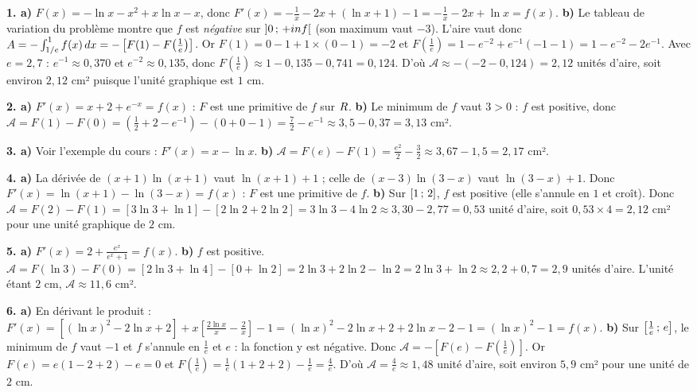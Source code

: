 \begin{corrige}[annales]
\textbf{1. a)} $F(x) = -\ln x-x^{2}+x\ln x-x$, donc
$F'(x) = -\frac1x-2x+\left(\ln x+1\right)-1 = -\frac1x-2x+\ln x = f(x)$.
\textbf{b)} Le tableau de variation du problème montre que $f$ est
\emph{négative} sur $\left]0\,;\,+inf\right[$ (son maximum vaut $-3$).
L'aire vaut donc
$A = -\int_{1/e}^{1} f(x)\,dx = -\left[F(1)-F\!\left(\frac1e\right)
\right]$. Or $F(1) = 0-1+1\times(0-1) = -2$ et
$F\!\left(\frac1e\right) = 1-e^{-2}+e^{-1}(-1-1) = 1-e^{-2}-2e^{-1}$. Avec
$e = 2{,}7$ : $e^{-1} \approx 0{,}370$ et $e^{-2} \approx 0{,}135$, donc
$F\!\left(\frac1e\right) \approx 1-0{,}135-0{,}741 = 0{,}124$. D'où
$\mathcal A \approx -(-2-0{,}124) = 2{,}12$ unités d'aire, soit environ
$2{,}12$ cm² puisque l'unité graphique est $1$ cm.

\textbf{2. a)} $F'(x) = x+2+e^{-x} = f(x)$ : $F$ est une primitive de $f$
sur $R$.
\textbf{b)} Le minimum de $f$ vaut $3>0$ : $f$ est positive, donc
$\mathcal A = F(1)-F(0) = \left(\frac12+2-e^{-1}\right)-\left(0+0-1\right)
= \frac72-e^{-1} \approx 3{,}5-0{,}37 = 3{,}13$ cm².

\textbf{3. a)} Voir l'exemple du cours : $F'(x) = x-\ln x$.
\textbf{b)} $\mathcal A = F(e)-F(1) = \frac{e^{2}}{2}-\frac32
\approx 3{,}67-1{,}5 = 2{,}17$ cm².

\textbf{4. a)} La dérivée de $(x+1)\ln(x+1)$ vaut $\ln(x+1)+1$ ; celle de
$(x-3)\ln(3-x)$ vaut $\ln(3-x)+1$. Donc $F'(x) = \ln(x+1)-\ln(3-x) = f(x)$ :
$F$ est une primitive de $f$.
\textbf{b)} Sur $\left[1\,;\,2\right]$, $f$ est positive (elle s'annule en $1$
et croît). Donc
$\mathcal A = F(2)-F(1) = \left[3\ln3+\ln1\right]-\left[2\ln2+2\ln2\right]
= 3\ln3-4\ln2 \approx 3{,}30-2{,}77 = 0{,}53$ unité d'aire, soit
$0{,}53\times4 = 2{,}12$ cm² pour une unité graphique de $2$ cm.

\textbf{5. a)} $F'(x) = 2+\frac{e^{x}}{e^{x}+1} = f(x)$.
\textbf{b)} $f$ est positive. $\mathcal A = F(\ln3)-F(0)
= \left[2\ln3+\ln4\right]-\left[0+\ln2\right] = 2\ln3+2\ln2-\ln2
= 2\ln3+\ln2 \approx 2{,}2+0{,}7 = 2{,}9$ unités d'aire. L'unité étant
$2$ cm, $\mathcal A \approx 11{,}6$ cm².

\textbf{6. a)} En dérivant le produit :
$F'(x) = \left[(\ln x)^{2}-2\ln x+2\right]
+x\left[\frac{2\ln x}{x}-\frac2x\right]-1
= (\ln x)^{2}-2\ln x+2+2\ln x-2-1 = (\ln x)^{2}-1 = f(x)$.
\textbf{b)} Sur $\left[\frac1e\,;\,e\right]$, le minimum de $f$ vaut $-1$ et
$f$ s'annule en $\frac1e$ et $e$ : la fonction y est négative. Donc
$\mathcal A = -\left[F(e)-F\!\left(\frac1e\right)\right]$. Or
$F(e) = e(1-2+2)-e = 0$ et
$F\!\left(\frac1e\right) = \frac1e(1+2+2)-\frac1e = \frac4e$. D'où
$\mathcal A = \frac4e \approx 1{,}48$ unité d'aire, soit environ
$5{,}9$ cm² pour une unité de $2$ cm.


\end{corrige}
